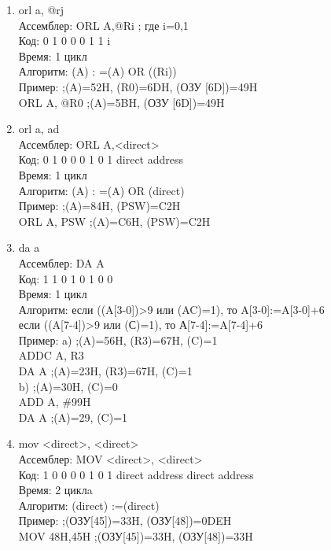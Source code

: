\begin{enumerate}
\item orl a, @rj \\
Ассемблер: 	ORL A,@Ri ; где i=0,1 \\
Код: 		0 1 0 0 0 1 1 i \\
Время: 		1 цикл \\
Алгоритм: 	(A) : =(A) OR ((Ri)) \\
Пример: 			;(A)=52H,  (R0)=6DH, (ОЗУ [6D])=49H \\
		ORL A, @R0	;(A)=5BH, (ОЗУ [6D])=49H \\

\item orl a, ad \\
Ассемблер: 	ORL A,<direct> \\
Код: 		0 1 0 0 0 1 0 1 direct address \\
Время: 		1 цикл \\
Алгоритм: 	(A) : =(A) OR (direct) \\
Пример: 			;(A)=84H, (PSW)=C2H \\
		ORL A, PSW	;(A)=C6H, (PSW)=C2H \\

\item da a \\
Ассемблер: 	DA A \\
Код: 		1 1 0 1 0 1 0 0 \\
Время: 		1 цикл \\
Алгоритм: 	если ((A[3-0])>9 или (AC)=1), то A[3-0]:=A[3-0]+6 \\
		    если ((A[7-4])>9 или (С)=1), то А[7-4]:=A[7-4]+6 \\
Пример: 	a) 		;(A)=56H, (R3)=67H, (C)=1 \\
		ADDC A, R3 \\
		DA A		;(A)=23H, (R3)=67H, (C)=1 \\
		b) 		;(A)=30H, (C)=0 \\
		ADD A, \#99H \\
		DA A		;(A)=29, (C)=1 \\

\item mov <direct>, <direct> \\
Ассемблер: 	MOV <direct>, <direct> \\
Код:    1 0 0 0 0 1 0 1 direct address direct address \\
Время: 	2 циклa \\
Алгоритм: 	(direct) :=(direct) \\
Пример:             ;(ОЗУ[45])=33H, (ОЗУ[48])=0DEH \\
        MOV 48H,45H ;(ОЗУ[45])=33H, (ОЗУ[48])=33H \\


\end{enumerate}

